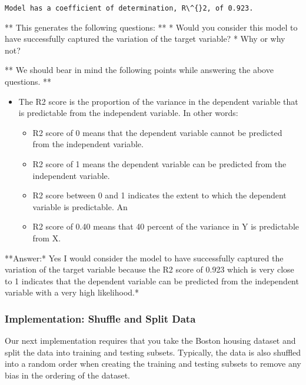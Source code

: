 \documentclass[11pt]{article}
\providecommand{\tightlist}{%
      \setlength{\itemsep}{0pt}\setlength{\parskip}{0pt}}
\begin{document}
    \begin{Verbatim}[commandchars=\\\{\}]
Model has a coefficient of determination, R\^{}2, of 0.923.

    \end{Verbatim}

    ** This generates the following questions: ** * Would you consider this
model to have successfully captured the variation of the target
variable? * Why or why not?

** We should bear in mind the following points while answering the above
questions. **

\begin{itemize}
\tightlist
\item
  The R2 score is the proportion of the variance in the dependent
  variable that is predictable from the independent variable. In other
  words:

  \begin{itemize}
  \tightlist
  \item
    R2 score of 0 means that the dependent variable cannot be predicted
    from the independent variable.
  \item
    R2 score of 1 means the dependent variable can be predicted from the
    independent variable.
  \item
    R2 score between 0 and 1 indicates the extent to which the dependent
    variable is predictable. An
  \item
    R2 score of 0.40 means that 40 percent of the variance in Y is
    predictable from X.
  \end{itemize}
\end{itemize}

    **Answer:* Yes I would consider the model to have successfully captured
the variation of the target variable because the R2 score of 0.923 which
is very close to 1 indicates that the dependent variable can be
predicted from the independent variable with a very high likelihood.*

    \subsubsection{Implementation: Shuffle and Split
Data}\label{implementation-shuffle-and-split-data}

Our next implementation requires that you take the Boston housing
dataset and split the data into training and testing subsets. Typically,
the data is also shuffled into a random order when creating the training
and testing subsets to remove any bias in the ordering of the dataset.
\end{document}
